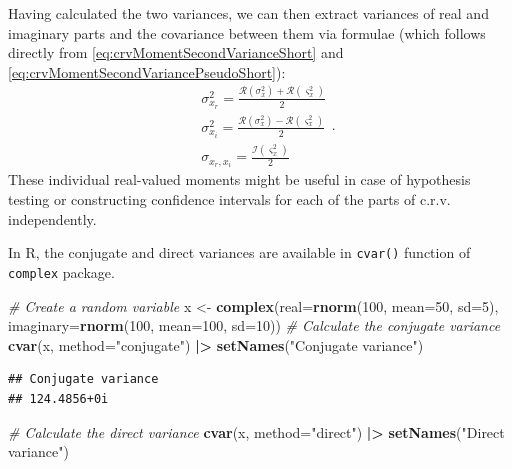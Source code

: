 \documentclass[
]{book}
\newenvironment{Shaded}{\begin{snugshade}}{\end{snugshade}}
\newcommand{\CommentTok}[1]{\textcolor[rgb]{0.56,0.35,0.01}{\textit{#1}}}
\newcommand{\DataTypeTok}[1]{\textcolor[rgb]{0.13,0.29,0.53}{#1}}
\newcommand{\DecValTok}[1]{\textcolor[rgb]{0.00,0.00,0.81}{#1}}
\newcommand{\ErrorTok}[1]{\textcolor[rgb]{0.64,0.00,0.00}{\textbf{#1}}}
\newcommand{\KeywordTok}[1]{\textcolor[rgb]{0.13,0.29,0.53}{\textbf{#1}}}
\newcommand{\NormalTok}[1]{#1}
\newcommand{\OperatorTok}[1]{\textcolor[rgb]{0.81,0.36,0.00}{\textbf{#1}}}
\newcommand{\StringTok}[1]{\textcolor[rgb]{0.31,0.60,0.02}{#1}}
\begin{document}
Having calculated the two variances, we can then extract variances of real and imaginary parts and the covariance between them via formulae (which follows directly from \eqref{eq:crvMomentSecondVarianceShort} and \eqref{eq:crvMomentSecondVariancePseudoShort}):
\begin{equation}
    \begin{aligned}
        & \sigma_{x_r}^2 = \frac{\mathcal{R}(\sigma^2_x) + \mathcal{R}(\varsigma^2_x)}{2} \\
        & \sigma_{x_i}^2 = \frac{\mathcal{R}(\sigma^2_x) - \mathcal{R}(\varsigma^2_x)}{2} \\
        & \sigma_{x_r,x_i} = \frac{\mathcal{I}(\varsigma^2_x)}{2}
    \end{aligned} .
    \label{eq:IndividualVariances}
\end{equation}
These individual real-valued moments might be useful in case of hypothesis testing or constructing confidence intervals for each of the parts of c.r.v. independently.

In R, the conjugate and direct variances are available in \texttt{cvar()} function of \texttt{complex} package.

\begin{Shaded}
\begin{Highlighting}[]
\CommentTok{\# Create a random variable}
\NormalTok{x \textless{}{-}}\StringTok{ }\KeywordTok{complex}\NormalTok{(}\DataTypeTok{real=}\KeywordTok{rnorm}\NormalTok{(}\DecValTok{100}\NormalTok{, }\DataTypeTok{mean=}\DecValTok{50}\NormalTok{, }\DataTypeTok{sd=}\DecValTok{5}\NormalTok{),}
             \DataTypeTok{imaginary=}\KeywordTok{rnorm}\NormalTok{(}\DecValTok{100}\NormalTok{, }\DataTypeTok{mean=}\DecValTok{100}\NormalTok{, }\DataTypeTok{sd=}\DecValTok{10}\NormalTok{))}
\CommentTok{\# Calculate the conjugate variance}
\KeywordTok{cvar}\NormalTok{(x, }\DataTypeTok{method=}\StringTok{"conjugate"}\NormalTok{) }\OperatorTok{|}\ErrorTok{\textgreater{}}
\StringTok{    }\KeywordTok{setNames}\NormalTok{(}\StringTok{"Conjugate variance"}\NormalTok{)}
\end{Highlighting}
\end{Shaded}

\begin{verbatim}
## Conjugate variance 
## 124.4856+0i
\end{verbatim}

\begin{Shaded}
\begin{Highlighting}[]
\CommentTok{\# Calculate the direct variance}
\KeywordTok{cvar}\NormalTok{(x, }\DataTypeTok{method=}\StringTok{"direct"}\NormalTok{) }\OperatorTok{|}\ErrorTok{\textgreater{}}
\StringTok{    }\KeywordTok{setNames}\NormalTok{(}\StringTok{"Direct variance"}\NormalTok{)}
\end{Highlighting}
\end{Shaded}
\end{document}
